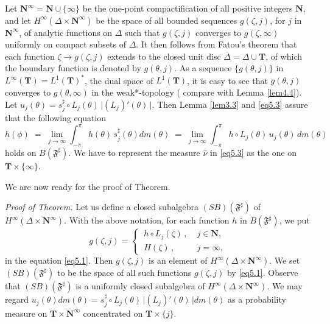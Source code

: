 \documentclass[12pt]{amsart}
\theoremstyle{plain}
\numberwithin{equation}{section}
\begin{document}
\medskip
Let $\mathbf{N}^\infty = \mathbf{N} \cup \{\infty\}$ be the
one-point compactification of all positive integers $\mathbf{N}$,
and let $H^\infty(\Delta\times\mathbf{N}^\infty)$ be the space
of all bounded sequences $g(\zeta,j)$, for $j$ in $\mathbf{N}^\infty$,
of analytic functions on $\Delta$ such that $g(\zeta,j)$
converges to $g(\zeta,\infty)$ uniformly on compact subsets of
$\Delta$. It then follows from Fatou's theorem that each function
$\zeta \to g(\zeta,j)$ extends to the closed unit disc
$\overline{\Delta} = \Delta\cup \mathbf{T}$, of which the boundary
function is denoted by $g(\theta,j)$. As a sequence $\{g(\theta,j)\}$
in $L^\infty(\mathbf{T})=L^1(\mathbf{T})^\ast$, the dual space of
$L^1(\mathbf{T})$, it is easy to see that $g(\theta,j)$ converges
to $g(\theta,\infty)$ in the weak*-topology
( compare with Lemma \ref{lem4.4}). Let $u_j(\theta)
= s_j^\sharp\circ L_j(\theta) \,\vert (L_j)'(\theta)\,\vert$.
Then Lemma \ref{lem3.3} and
\eqref{eq5.3} assure that the following equation
\begin{equation}
h(\phi)\; =\; \lim_{j\to \infty} \int_{-\pi}^{\pi}
h(\theta)\,s^\sharp_j(\theta) dm(\theta)
\;=\;\lim_{j\to \infty} \int_{-\pi}^{\pi}
h\circ L_j(\theta)\, u_j(\theta)\, dm(\theta)
\label{eq5.4}
\end{equation}
holds on $B(\mathfrak{F}^\sharp)$. We have to represent the
measure $\widehat{\nu}$ in \eqref{eq5.3} as the one on
$\mathbf{T}\times \{\infty\}$.



\bigskip
We are now ready for the proof of Theorem.

\medskip
\noindent
{\itshape Proof of Theorem.\;}
Let us define a closed subalgebra $(SB)(\mathfrak{F}^\sharp)$
of $H^\infty(\Delta\times\mathbf{N}^\infty)$. With the above notation,
for each function $h$ in $B(\mathfrak{F}^\sharp)$, we put
\begin{equation}
g(\zeta,j)=
\begin{cases}
\; h\circ L_j(\zeta)\,, & \;j \in \mathbf{N}, \\
\; H(\zeta)\,, & \;j = \infty,
\end{cases}
\label{eq5.5}
\end{equation}
in the equation \eqref{eq5.1}. Then $g(\zeta,j)$ is an element of
$H^\infty(\Delta\times\mathbf{N}^\infty)$. We set $(SB)(\mathfrak{F}^\sharp)$
to be the space of all such functions $g(\zeta,j)$ by \eqref{eq5.1}.
Observe that $(SB)(\mathfrak{F}^\sharp)$ is a uniformly closed subalgebra
of $H^\infty(\Delta\times\mathbf{N}^\infty)$. We may regard
$u_j(\theta)dm(\theta)=
s_j^\sharp\circ L_j(\theta) \,\vert (L_j)'(\theta)\,\vert dm(\theta)$
as a probability measure on $\mathbf{T}\times \mathbf{N}^\infty$
concentrated on $\mathbf{T}\times \{j\}$.
\end{document}
